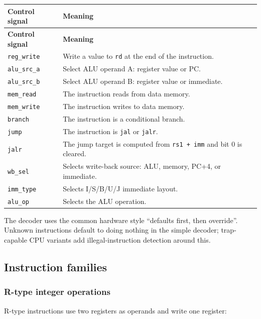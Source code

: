\begin{longtable}{|>{\RaggedRight\arraybackslash}p{}|>{\RaggedRight\arraybackslash}p{}|}
\hline
\textbf{Control signal} & \textbf{Meaning} \\
\hline
\endfirsthead
\hline
\textbf{Control signal} & \textbf{Meaning} \\
\hline
\endhead
\texttt{reg\_write} & Write a value to \texttt{rd} at the end of the instruction. \\
\hline
\texttt{alu\_src\_a} & Select ALU operand A: register value or PC. \\
\hline
\texttt{alu\_src\_b} & Select ALU operand B: register value or immediate. \\
\hline
\texttt{mem\_read} & The instruction reads from data memory. \\
\hline
\texttt{mem\_write} & The instruction writes to data memory. \\
\hline
\texttt{branch} & The instruction is a conditional branch. \\
\hline
\texttt{jump} & The instruction is \texttt{jal} or \texttt{jalr}. \\
\hline
\texttt{jalr} & The jump target is computed from \texttt{rs1 + imm} and bit 0 is cleared. \\
\hline
\texttt{wb\_sel} & Selects write-back source: ALU, memory, PC+4, or immediate. \\
\hline
\texttt{imm\_type} & Selects I/S/B/U/J immediate layout. \\
\hline
\texttt{alu\_op} & Selects the ALU operation. \\
\hline
\end{longtable}

The decoder uses the common hardware style “defaults first, then override”. Unknown instructions default to doing nothing in the simple decoder; trap-capable CPU variants add illegal-instruction detection around this.

\subsection{Instruction families}

\subsubsection{R-type integer operations}

R-type instructions use two registers as operands and write one register:


